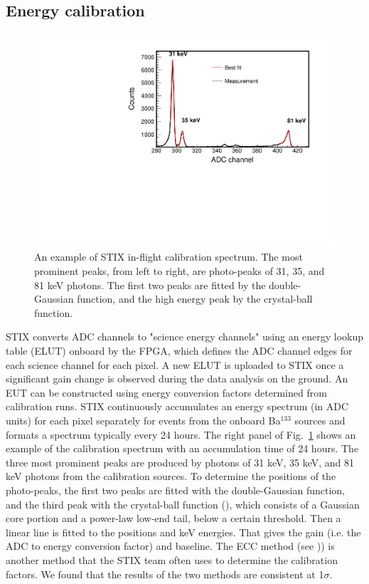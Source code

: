 \documentclass[referee]{aa} %
\begin{document}
\subsection{Energy calibration}
\begin{figure}
 \centering
  \includegraphics[width=0.8\linewidth]{figures/cal-fit.pdf}
  \caption{An example of STIX in-flight calibration spectrum.
  The most prominent peaks, from left to right, are photo-peaks of 31, 35, and 81 keV
  photons. The first two peaks are fitted by the double-Gaussian function, and the high energy peak by  
  the crystal-ball function. }
    \label{fig:cal-fit}
\end{figure}
STIX converts ADC channels to "science energy channels" using an energy lookup table (ELUT) 
onboard by the FPGA, which defines the ADC channel edges  for each science channel for each pixel. 
A new ELUT is uploaded to STIX once a significant gain change is observed during the data analysis on the ground.  An EUT can be constructed using energy conversion factors determined from calibration runs. 
STIX continuously accumulates an  energy spectrum (in ADC units) for each pixel separately for events from the onboard Ba$^{133}$ sources and formats a  spectrum typically every 24 hours. 
The right panel of Fig.~\ref{fig:cal-fit} shows an example of the calibration spectrum with an accumulation time of 24 hours.  The three most prominent peaks are produced by photons of 31 keV, 35 keV, and 81 keV photons from the calibration sources. To determine the positions of the photo-peaks, the first two peaks are fitted with the double-Gaussian function, and the third peak with the crystal-ball function (\cite{crsystallball}),
which consists of a Gaussian core portion 
and a power-law low-end tail, below a certain threshold.
Then a linear line is fitted to the positions and keV energies.  That gives the gain (i.e. the ADC to energy conversion factor) and baseline.
The ECC method (see \cite{ecc,ecc2})) is another method that the STIX team often uses to determine the calibration factors.  We found that the results of the two methods are consistent at 1$\sigma$.
\end{document}
